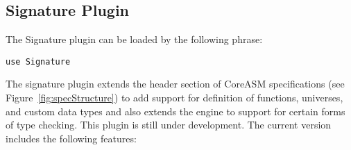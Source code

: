 \documentclass{article}
\newcommand{\CoreASM}{{\sffamily CoreASM}\xspace}
\begin{document}
\subsection{Signature Plugin}
\label{signature}

The Signature plugin can be loaded by the following  phrase:

\begin{lstlisting}
use Signature
\end{lstlisting}

\noindent The signature plugin extends the header section of \CoreASM
specifications (see Figure~\ref{fig:specStructure}) to add support for definition of functions, universes, and custom data types and also extends the engine to support for certain forms of type checking. This plugin is still under development. The current version includes the following features:
\end{document}

